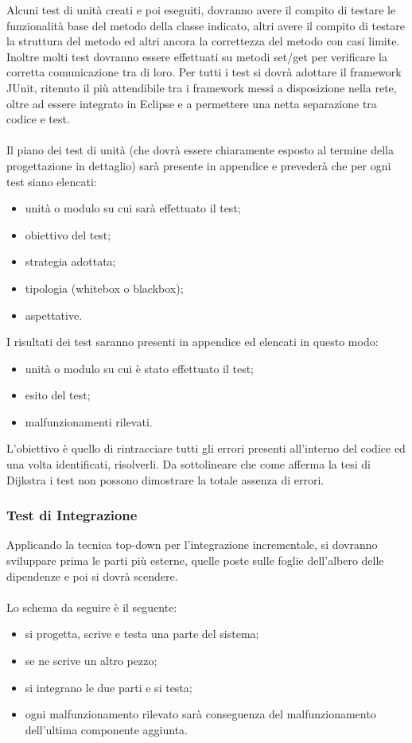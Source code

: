 Alcuni test di unit\`a creati e poi eseguiti, dovranno  avere il
compito di testare le funzionalit\`a base del metodo della classe indicato,
altri avere il compito di testare la struttura del metodo ed altri ancora la
correttezza del metodo con casi limite. Inoltre molti test dovranno essere
effettuati su metodi set/get per verificare la corretta comunicazione tra di loro. Per tutti i test si dovr\`a adottare il framework
JUnit, ritenuto il pi\`u attendibile tra i framework messi a disposizione nella
rete, oltre ad essere integrato in Eclipse e a permettere una netta separazione
tra codice e test.
\\\\
Il piano dei test di unit\`a (che dovr\`a essere chiaramente esposto al termine
della progettazione in dettaglio) sar\`a presente in appendice e preveder\`a
che per ogni test siano elencati:
\begin{itemize}
  \item unit\`a o modulo su cui sar\`a effettuato il test;
  \item obiettivo del test;
  \item strategia adottata;
  \item tipologia (whitebox o blackbox);
  \item aspettative.
\end{itemize}

I risultati dei test saranno presenti in appendice ed elencati in
questo modo:
\begin{itemize}
  \item unit\`a o modulo su cui \`e stato effettuato il test;
  \item esito del test;
  \item malfunzionamenti rilevati.
\end{itemize}

L'obiettivo \`e quello di rintracciare tutti gli errori presenti all'interno del
codice ed una volta identificati, risolverli. Da sottolineare che come afferma la tesi di Dijkstra 
i test non possono dimostrare la totale assenza di errori.


\subsubsection*{Test di Integrazione} 
Applicando la tecnica top-down per
l'integrazione incrementale, si dovranno sviluppare prima le parti pi\`u
esterne, quelle poste sulle foglie dell'albero delle dipendenze e poi si dovr\`a
scendere.
\\\\
Lo schema da seguire \`e il seguente:
\begin{itemize}
  \item si progetta, scrive e testa una parte del sistema;
  \item se ne scrive un altro pezzo;
  \item si integrano le due parti e si testa;
  \item ogni malfunzionamento rilevato sar\`a conseguenza del malfunzionamento
  dell'ultima componente aggiunta.
\end{itemize}

